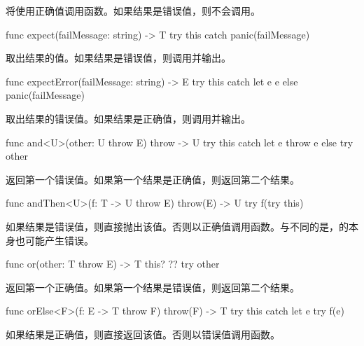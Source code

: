 \pnum
{}将使用正确值调用函数。如果结果是错误值，则不会调用。

\begin{itemdecl}
func expect(failMessage: string) -> T {
    try this catch { panic(failMessage) }
}
\end{itemdecl}

\pnum
{}取出结果的值。如果结果是错误值，则调用并输出。

\begin{itemdecl}
func expectError(failMessage: string) -> E {
    try this catch let e { e } else { panic(failMessage) }
}
\end{itemdecl}

\pnum
{}取出结果的错误值。如果结果是正确值，则调用并输出。

\begin{itemdecl}
func and<U>(other: U throw E) throw -> U {
    try this catch let e { throw e } else { try other }
}
\end{itemdecl}

\pnum
{}返回第一个错误值。如果第一个结果是正确值，则返回第二个结果。

\begin{itemdecl}
func andThen<U>(f: T -> U throw E) throw(E) -> U {
    try f(try this)
}
\end{itemdecl}

\pnum
如果结果是错误值，则直接抛出该值。否则以正确值调用函数。\enternote 与不同的是，的本身也可能产生错误。\exitnote

\begin{itemdecl}
func or(other: T throw E) -> T {
    this? ?? try other
}
\end{itemdecl}

\pnum
{}返回第一个正确值。如果第一个结果是错误值，则返回第二个结果。

\begin{itemdecl}
func orElse<F>(f: E -> T throw F) throw(F) -> T {
    try this catch let e { try f(e) }
}
\end{itemdecl}

\pnum
如果结果是正确值，则直接返回该值。否则以错误值调用函数。

